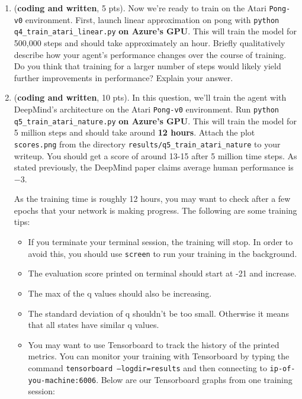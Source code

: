 \documentclass{article}
\newenvironment{myitemize}
{ \begin{itemize}
		\setlength{\itemsep}{0pt}
		\setlength{\parskip}{0pt}
		\setlength{\parsep}{0pt}     }
	{ \end{itemize}                  }
\begin{document}
\begin{enumerate}

\item (\textbf{coding and written}, 5 pts). Now we're ready to train on the Atari \texttt{Pong-v0} environment. First, launch linear approximation on pong with \texttt{python q4\_train\_atari\_linear.py} \textbf{on Azure's GPU}. This will train the model for 500,000 steps and should take approximately an hour.  Briefly qualitatively describe how your agent's performance changes over the course of training. Do you think that training for a larger number of steps would likely yield further improvements in performance? Explain your answer.

\item (\textbf{coding and written}, 10 pts). In this question, we'll train the agent with DeepMind's architecture on the Atari \texttt{Pong-v0} environment. Run \texttt{python q5\_train\_atari\_nature.py} \textbf{on Azure's GPU}.  This will train the model for 5 million steps and should take around \textbf{12 hours}.  Attach the plot \texttt{scores.png} from the directory \texttt{results/q5\_train\_atari\_nature} to your writeup.
You should get a score of around 13-15 after 5 million time steps.  As stated previously, the DeepMind paper claims average human performance is $ -3 $.


As the training time is roughly 12 hours, you may want to check after a few epochs that your network is making progress.  The following are some training tips:

\begin{myitemize}
\item If you terminate your terminal session, the training will stop.  In order to avoid this, you should use \texttt{screen} to run your training in the background.
\item The evaluation score printed on terminal should start at -21 and increase.
\item The max of the q values should also be increasing.
\item The standard deviation of q shouldn't be too small. Otherwise it means that all states have similar q values.
\item You may want to use Tensorboard to track the history of the printed metrics. You can monitor your training with Tensorboard by typing the command \texttt{tensorboard --logdir=results} and then connecting to \texttt{ip-of-you-machine:6006}.  Below are our Tensorboard graphs from one training session:
\end{myitemize}


\end{enumerate}
\end{document}
